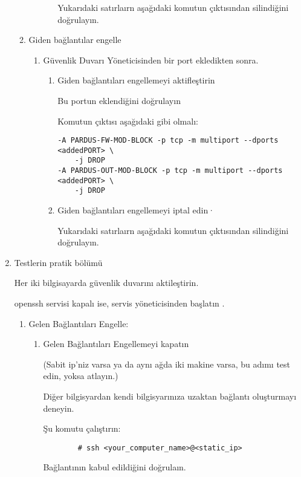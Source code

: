 \documentclass[a4paper,10pt]{article}
\begin{document}
\begin{enumerate}
\begin{enumerate}
\begin{enumerate}
\begin{enumerate}
    	Yukarıdaki satırlaırn aşağıdaki komutun çıktısından silindiğini doğrulayın.
        \end{enumerate}
    \end{enumerate}

\item Giden bağlantılar engelle 
\begin{enumerate}
    \item Güvenlik Duvarı Yöneticisinden bir port ekledikten sonra.
        \begin{enumerate}
        \item Giden bağlantıları engellemeyi aktifleştirin

            Bu portun eklendiğini doğrulayın

            Komutun çıktısı aşağıdaki gibi olmalı:

\begin{verbatim}
-A PARDUS-FW-MOD-BLOCK -p tcp -m multiport --dports <addedPORT> \
    -j DROP
-A PARDUS-OUT-MOD-BLOCK -p tcp -m multiport --dports <addedPORT> \
    -j DROP
\end{verbatim} 

        \item Giden bağlantıları engellemeyi iptal edin·

              Yukarıdaki satırlaırn aşağıdaki komutun çıktısından silindiğini doğrulayın.
        \end{enumerate}
    \end{enumerate}
\end{enumerate}
\item Testlerin pratik bölümü

	Her iki bilgisayarda güvenlik duvarını aktileştirin.	

    	openssh servisi kapalı ise, servis yöneticisinden başlatın .
\begin{enumerate}
    \item Gelen Bağlantıları Engelle: 

	
	
    \begin{enumerate}
        \item Gelen Bağlantıları Engellemeyi kapatın

		(Sabit ip'niz varsa ya da aynı ağda iki makine varsa, bu adımı test edin, yoksa atlayın.)

              Diğer bilgisyardan kendi bilgisyarınıza uzaktan bağlantı oluşturmayı deneyin.

              Şu komutu çalıştırın:
		\begin{verbatim}
		# ssh <your_computer_name>@<static_ip>
		\end{verbatim} 
              Bağlantının kabul edildiğini doğrulaın.


\end{enumerate}
\end{enumerate}
\end{enumerate}
\end{document}
